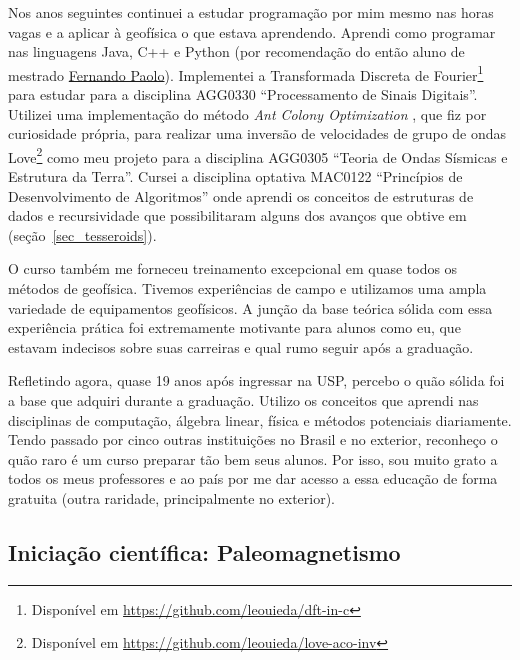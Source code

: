 \documentclass[10pt,a4paper,oneside]{book}
\begin{document}
Nos anos seguintes continuei a estudar programação por mim mesmo nas horas
vagas e a aplicar à geofísica o que estava aprendendo.
Aprendi como programar nas linguagens Java, C++ e Python (por recomendação do
então aluno de mestrado \href{https://www.linkedin.com/in/fspaolo/}{Fernando Paolo}).
Implementei a Transformada Discreta de Fourier\footnote{Disponível em
\url{https://github.com/leouieda/dft-in-c}} para estudar para a disciplina
AGG0330 ``Processamento de Sinais Digitais''.
Utilizei uma implementação do método \textit{Ant Colony Optimization}
\citep{Socha2008}, que fiz por curiosidade própria, para realizar uma inversão
de velocidades de grupo de ondas
Love\footnote{Disponível em \url{https://github.com/leouieda/love-aco-inv}}
como meu projeto para a disciplina AGG0305 ``Teoria de Ondas Sísmicas e
Estrutura da Terra''.
Cursei a disciplina optativa MAC0122 ``Princípios de Desenvolvimento de
Algoritmos'' onde aprendi os conceitos de estruturas de dados e recursividade
que possibilitaram alguns dos avanços que obtive em \citet{Uieda2016}
(seção~\ref{sec_tesseroids}).

O curso também me forneceu treinamento excepcional em quase todos os métodos de
geofísica.
Tivemos experiências de campo e utilizamos uma ampla variedade de equipamentos
geofísicos.
A junção da base teórica sólida com essa experiência prática foi
extremamente motivante para alunos como eu, que estavam indecisos sobre suas
carreiras e qual rumo seguir após a graduação.

Refletindo agora, quase 19 anos após ingressar na USP, percebo o quão sólida
foi a base que adquiri durante a graduação. Utilizo os conceitos que aprendi
nas disciplinas de computação, álgebra linear, física e métodos potenciais
diariamente. Tendo passado por cinco outras instituições no Brasil e no
exterior, reconheço o quão raro é um curso preparar tão bem seus alunos.
Por isso, sou muito grato a todos os meus professores e ao país por me dar
acesso a essa educação de forma gratuita (outra raridade, principalmente no
exterior).

\subsection{Iniciação científica: Paleomagnetismo}
\end{document}
